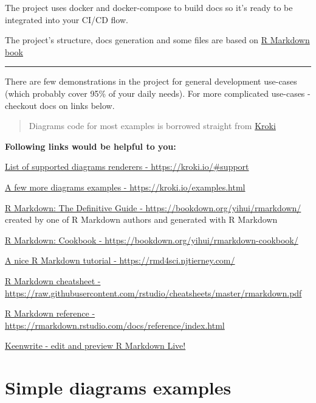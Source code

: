 \documentclass[12pt,a4paper,12pt,oneside,openany]{book}
\begin{document}
The project uses docker and docker-compose to build docs so it's ready to be integrated into your CI/CD flow.

The project's structure, docs generation and some files are based on \href{https://github.com/rstudio/rmarkdown-book}{R Markdown book}

\begin{center}\rule{0.5\linewidth}{\linethickness}\end{center}

There are few demonstrations in the project for general development use-cases (which probably cover 95\% of your daily needs). For more complicated use-cases - checkout docs on links below.

\begin{quote}
Diagrams code for most examples is borrowed straight from \href{https://kroki.io/examples.html}{Kroki}
\end{quote}

\textbf{Following links would be helpful to you:}

\href{https://kroki.io/\#support}{List of supported diagrams renderers - https://kroki.io/\#support}

\href{https://kroki.io/examples.html}{A few more diagrams examples - https://kroki.io/examples.html}

\href{https://bookdown.org/yihui/rmarkdown/}{R Markdown: The Definitive Guide - https://bookdown.org/yihui/rmarkdown/}\\
created by one of R Markdown authors and generated with R Markdown

\href{https://bookdown.org/yihui/rmarkdown-cookbook/}{R Markdown: Cookbook - https://bookdown.org/yihui/rmarkdown-cookbook/}

\href{https://rmd4sci.njtierney.com/}{A nice R Markdown tutorial - https://rmd4sci.njtierney.com/}

\href{https://raw.githubusercontent.com/rstudio/cheatsheets/master/rmarkdown.pdf}{R Markdown cheatsheet - https://raw.githubusercontent.com/rstudio/cheatsheets/master/rmarkdown.pdf}

\href{https://rmarkdown.rstudio.com/docs/reference/index.html}{R Markdown reference - https://rmarkdown.rstudio.com/docs/reference/index.html}

\href{https://github.com/DaveJarvis/keenwrite}{Keenwrite - edit and preview R Markdown Live!}

\chapter{Simple diagrams examples}\label{simple-diagrams-examples}
\end{document}
